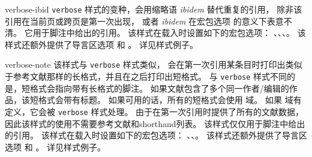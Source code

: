 \begin{marglist}
\item[verbose-ibid]
\texttt{verbose} 样式的变种，会用缩略语 \emph{ibidem} 替代重复的引用，
除非该引用在当前页或跨页是第一次出现，
或者 \emph{ibidem} 在宏包选项  的意义下表意不清。
它用于脚注中给出的引用。
该样式在载入时设置如下的宏包选项：
、、、。
该样式还额外提供了导言区选项  和 。
详见样式例子。

\item[verbose-note]
该样式与 \texttt{verbose} 样式类似，
会在第一次引用某条目时打印出类似于参考文献那样的长格式，并且在之后打印出短格式。
与 \texttt{verbose} 样式不同的是，短格式会指向带有长格式的脚注。
如果文献包含了多个同一作者/编辑的作品，该短格式会带有标题。
如果可用的话，所有的短格式会使用  域。
如果  域有定义，它会被 \texttt{verbose} 样式处理。
由于在第一次引用时提供了所有的文献数据，因此该样式的使用不需要参考文献和shorthand列表。
该样式仅仅用于脚注中给出的引用。
该样式在载入时设置如下的宏包选项：
、、。
该样式还额外提供了导言区选项  和 。
详见样式例子。


\end{marglist}
